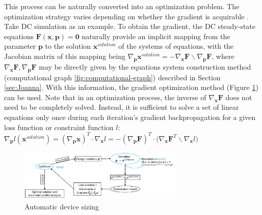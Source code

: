 This process can be naturally converted into an optimization problem. The optimization strategy varies depending on whether the gradient is acquirable \cite{zhan2004optimization,agrawal2006circuit,huang2013efficient,nieuwoudt2005multi,peng2016efficient,girardi2011analog,lyu2018batch,wang2014enabling,lyu2017efficient,tang2018parametric}. Take DC simulation as an example. To obtain the gradient, the DC steady-state equations $\bm{F}(\bm{x},\bm{p})=\bm{0}$ naturally provide an implicit mapping from the parameter $\bm{p}$ to the solution $\bm{x}^{solution}$ of the systems of equations, with the Jacobian matrix of this mapping being $\nabla_{\bm{p}}\bm{x}^{solution}=-\nabla_{\bm{x}}\bm{F}\backslash\nabla_{\bm{p}}\bm{F}$, where $\nabla_{\bm{x}}\bm{F},\nabla_{\bm{p}}\bm{F}$ may be directly given by the equations system construction method (computational graph \ref{fig:computational-graph}) described in Section \ref{sec:Joanna}.
With this information, the gradient optimization method (Figure \ref{fig:solve-then-optimize}) can be used.
Note that in an optimization process, the inverse of $\nabla_{\bm{x}}\bm{F}$ does not need to be completely solved.
Instead, it is sufficient to solve a set of linear equations only once during each iteration's gradient backpropagation for a given loss function or constraint function $l$:
$\nabla_{\bm{p}}l(\bm{x}^{solution})=(\nabla_{\bm{p}}\bm{x})^T\cdot\nabla_{\bm{x}}l
=-(\nabla_{\bm{p}}\bm{F})^T\cdot\big(\nabla_{\bm{x}}\bm{F}^T\backslash\nabla_{\bm{x}}l\big)$
\begin{figure}[htpb]
  \centering
    \includegraphics[width = 0.7\textwidth]{fig/solve-then-optimize.pdf}
  \caption{Automatic device sizing}
  \label{fig:solve-then-optimize}
\end{figure}

